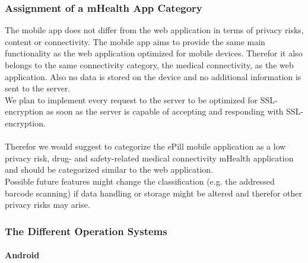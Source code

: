 \subsubsection{Assignment of a mHealth App Category}
The mobile app does not differ from the web application in terms of privacy risks, content or connectivity. The mobile app aims to provide the same main functionality as the web application optimized for mobile devices. Therefor it also belongs to the same connectivity category, the medical connectivity, as the web application. Also no data is stored on the device and no additional information is sent to the server. 
\\
We plan to implement every request to the server to be optimized for SSL-encryption as soon as the server is capable of accepting and responding with SSL-encryption. 
\\
\\
Therefor we would suggest to categorize the ePill mobile application as a low privacy risk, drug- and safety-related medical connectivity mHealth application and should be categorized similar to the web application. 
\\
Possible future features might change the classification (e.g. the addressed barcode scanning) if data handling or storage might be altered and therefor other privacy risks may arise.

\subsubsection{The Different Operation Systems}
\paragraph{Android}$\;$

